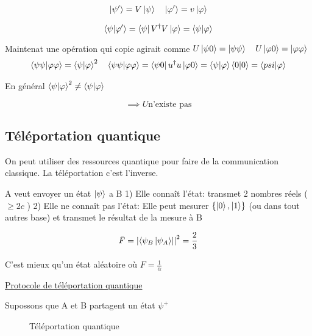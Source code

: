 $$\ket{\psi'}= V \ket{\psi} \quad \ket{\varphi'} = v \ket{\varphi}$$ 

$$\bra{\psi}\ket{\varphi'} = \bra{\psi} V^{\dagger}V \ket{\varphi} = \bra{\psi} \ket{\varphi}$$ 


Maintenat une opération qui copie agirait comme $U\ket{\psi 0} = \ket{\psi \psi} \quad U \ket{\varphi 0} = \ket{\varphi \varphi}$ \begin{align*}
    \bra{\psi \psi} \ket{\varphi \varphi} = \bra{\psi} \ket{\varphi}^2 \quad \bra{\psi \psi} \ket{\varphi\varphi} = \bra{\psi 0} u^{\dagger}u \ket{\varphi 0} = \bra{\psi} \ket{\varphi} \bra{0}\ket{0} = \bra{psi} \ket{\varphi}
\end{align*}

En général $\bra{\psi}\ket{\varphi}^2 \neq \bra{\psi}\ket{\varphi}$ 


$$\implies U \text{n'existe pas} $$ 

\subsection{Téléportation quantique}

On peut utiliser des ressources quantique pour faire de la communication classique. La téléportation c'est l'inverse.

A veut envoyer un état $\ket{\psi}$ a B
1) Elle connaît l'état: transmet 2 nombres réels ( $\geq 2c$  )
2) Elle ne connaît pas l'état: Elle peut mesurer $\{  \ket{0}, \ket{ 1 } \} $ (ou dans tout autres base) et transmet le résultat de la mesure à B

$$\bar F= \abs{\bra{\psi_{B}\ket{\psi_A}}}^{2} = \frac{2}{3}  $$ 

C'est mieux qu'un état aléatoire où $ F = \frac{1}{\alpha} $ 


\underline{Protocole de téléportation quantique} 

Supossons que A et B partagent un état $\psi^+$

\begin{figure}[ht]
    \centering
    \caption{Téléportation quantique}
    \label{fig:téléportation-quantique}
\end{figure}


